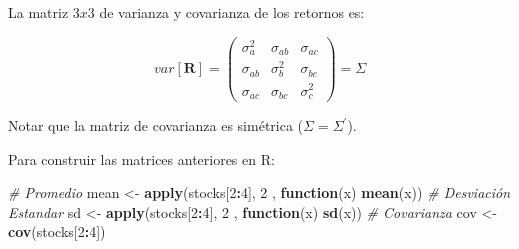 \documentclass[12pt,]{book}
\newenvironment{Shaded}{\begin{snugshade}}{\end{snugshade}}
\newcommand{\KeywordTok}[1]{\textcolor[rgb]{0.13,0.29,0.53}{\textbf{#1}}}
\newcommand{\DecValTok}[1]{\textcolor[rgb]{0.00,0.00,0.81}{#1}}
\newcommand{\StringTok}[1]{\textcolor[rgb]{0.31,0.60,0.02}{#1}}
\newcommand{\CommentTok}[1]{\textcolor[rgb]{0.56,0.35,0.01}{\textit{#1}}}
\newcommand{\ControlFlowTok}[1]{\textcolor[rgb]{0.13,0.29,0.53}{\textbf{#1}}}
\newcommand{\OperatorTok}[1]{\textcolor[rgb]{0.81,0.36,0.00}{\textbf{#1}}}
\newcommand{\NormalTok}[1]{#1}
\begin{document}
La matriz \(3x3\) de varianza y covarianza de los retornos es:

\[
var[\mathbf{R}] = 
\begin{pmatrix}
    \sigma^2_{a} & \sigma_{ab}  & \sigma_{ac} \\
    \sigma_{ab}  & \sigma^2_{b} & \sigma_{bc} \\
    \sigma_{ac}  & \sigma_{bc}  &  \sigma^2_{c}  
\end{pmatrix}
    =
\Sigma
\]

Notar que la matriz de covarianza es simétrica
(\(\Sigma = \Sigma^{'}\)).

Para construir las matrices anteriores en R:

\begin{Shaded}
\begin{Highlighting}[]
\CommentTok{# Promedio}
\NormalTok{mean <-}\StringTok{ }\KeywordTok{apply}\NormalTok{(stocks[}\DecValTok{2}\OperatorTok{:}\DecValTok{4}\NormalTok{], }\DecValTok{2}\NormalTok{ , }\ControlFlowTok{function}\NormalTok{(x) }\KeywordTok{mean}\NormalTok{(x)) }
\CommentTok{# Desviación Estandar}
\NormalTok{sd   <-}\StringTok{ }\KeywordTok{apply}\NormalTok{(stocks[}\DecValTok{2}\OperatorTok{:}\DecValTok{4}\NormalTok{], }\DecValTok{2}\NormalTok{ , }\ControlFlowTok{function}\NormalTok{(x) }\KeywordTok{sd}\NormalTok{(x))}
\CommentTok{# Covarianza}
\NormalTok{cov  <-}\StringTok{ }\KeywordTok{cov}\NormalTok{(stocks[}\DecValTok{2}\OperatorTok{:}\DecValTok{4}\NormalTok{])   }
\end{Highlighting}
\end{Shaded}


\end{document}
